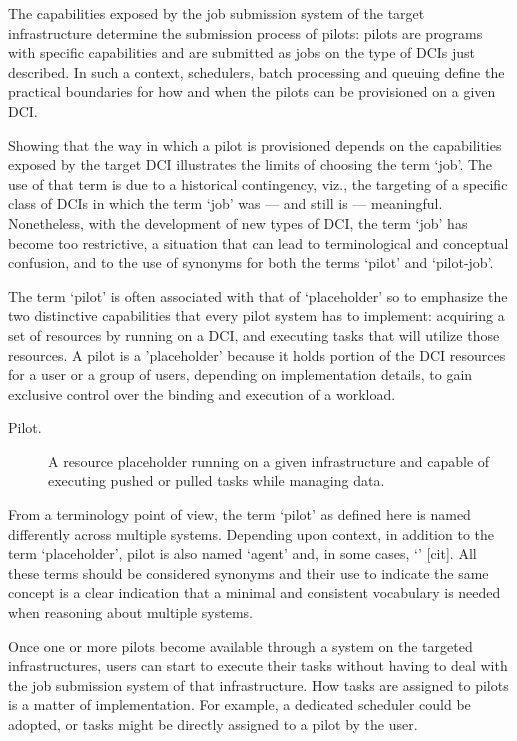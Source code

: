 \documentclass{sig-alternate}
\begin{document}
The capabilities exposed by the job submission system of the target
infrastructure determine the submission process of pilots: pilots are programs
with specific capabilities and are submitted as jobs on the type of DCIs just
described. In such a context, schedulers, batch processing and queuing define
the practical boundaries for how and when the pilots can be provisioned on a
given DCI.

Showing that the way in which a pilot is provisioned depends on the
capabilities exposed by the target DCI illustrates the limits of choosing the
term `job'. The use of that term is due to a historical contingency, viz., the
targeting of a specific class of DCIs in which the term `job' was --- and still
is --- meaningful. Nonetheless, with the development of new types of DCI, the
term `job' has become too restrictive, a situation that can lead to
terminological and conceptual confusion, and to the use of synonyms for both
the terms `pilot' and `pilot-job'.

The term `pilot' is often associated with that of `placeholder' so to
emphasize the two distinctive capabilities that every pilot system has to
implement: acquiring a set of resources by running on a DCI, and executing
tasks that will utilize those resources. A pilot is a 'placeholder' because it
holds portion of the DCI resources for a user or a group of users, depending
on implementation details, to gain exclusive control over the binding and
execution of a workload.

\begin{description}
\item[Pilot.] A resource placeholder running on a given infrastructure
  and capable of executing pushed or pulled tasks while managing
  data.
\end{description}

From a terminology point of view, the term `pilot' as defined here is
named differently across multiple \pilotjob systems. Depending upon
context, in addition to the term `placeholder', pilot is also named
`agent' and, in some cases, `\pilotjob' [cit]. All these terms should be
considered synonyms and their use to indicate the same concept is a clear
indication that a minimal and consistent vocabulary is needed when reasoning
about multiple \pilotjob systems.

Once one or more pilots become available through a \pilotjob system on the
targeted infrastructures, users can start to execute their tasks without
having to deal with the job submission system of that infrastructure.
How tasks are assigned to pilots is a matter of implementation. For example, a
dedicated scheduler could be adopted, or tasks might be directly assigned to a
pilot by the user. 
\end{document}
